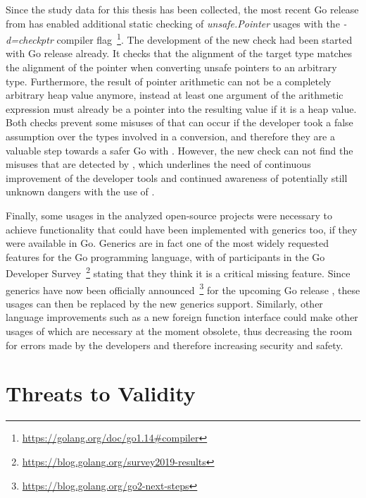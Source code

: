 Since the study data for this thesis has been collected, the most recent Go release  from
 has enabled additional static checking of \textit{unsafe.Pointer} usages with the
\textit{-d=checkptr} compiler flag~\footnote{\url{https://golang.org/doc/go1.14\#compiler}}.
The development of the new check had been started with Go release  already.
It checks that the alignment of the target type matches the alignment of the pointer when converting unsafe pointers to
an arbitrary type.
Furthermore, the result of pointer arithmetic can not be a completely arbitrary heap value anymore, instead at least one
argument of the arithmetic expression must already be a pointer into the resulting value if it is a heap value.
Both checks prevent some misuses of \unsafe{} that can occur if the developer took a false assumption over the types
involved in a conversion, and therefore they are a valuable step towards a safer Go with \unsafe{}.
However, the new check can not find the misuses that are detected by \toolSafer{}, which underlines the need of
continuous improvement of the developer tools and continued awareness of potentially still unknown dangers with the use
of \unsafe{}.

Finally, some \unsafe{} usages in the analyzed open-source projects were necessary to achieve functionality that could
have been implemented with generics too, if they were available in Go.
Generics are in fact one of the most widely requested features for the Go programming language, with  of
participants in the  Go Developer Survey~\footnote{\url{https://blog.golang.org/survey2019-results}}
stating that they think it is a critical missing feature.
Since generics have now been officially announced~\footnote{\url{https://blog.golang.org/go2-next-steps}} for the
upcoming Go release , these \unsafe{} usages can then be replaced by the new generics support.
Similarly, other language improvements such as a new foreign function interface could make other usages of \unsafe{}
which are necessary at the moment obsolete, thus decreasing the room for errors made by the developers and therefore
increasing security and safety.



\section{Threats to Validity}\label{sec:discussion:threats-to-validity}

